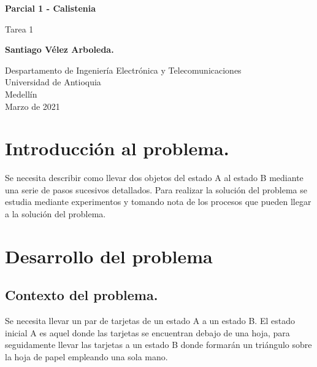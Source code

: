 \documentclass{article}
\begin{document}
\begin{titlepage}
    \begin{center}
        \vspace*{1cm}
            
        \Huge
        \textbf{Parcial 1 - Calistenia}
            
        \vspace{0.5cm}
        \LARGE
        Tarea 1
            
        \vspace{1.5cm}
            
        \textbf{Santiago Vélez Arboleda.}
            
        \vfill
            
        \vspace{0.8cm}
            
        \Large
        Despartamento de Ingeniería Electrónica y Telecomunicaciones\\
        Universidad de Antioquia\\
        Medellín\\
        Marzo de 2021
            
    \end{center}
\end{titlepage}

\tableofcontents
\newpage
\section{Introducción al problema.}\label{intro}
Se necesita  describir como llevar  dos objetos del estado A al estado B mediante una serie de pasos sucesivos detallados. Para realizar la solución del problema se estudia  mediante experimentos y tomando nota de los procesos que pueden llegar a la solución del problema. 

\section{Desarrollo del problema} \label{contenido}
 
\subsection{Contexto del problema.}
Se necesita llevar un par de tarjetas de un estado A a un estado B. El estado inicial A es aquel donde las tarjetas se encuentran debajo de una hoja, para seguidamente llevar las tarjetas a un estado B donde formarán un triángulo sobre la hoja de papel  empleando una sola mano.
\end{document}
